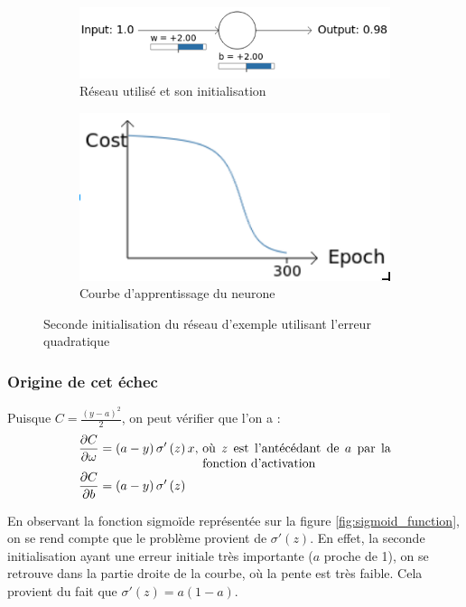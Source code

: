 \begin{figure}[h]
\centering
\begin{subfigure}{.5\textwidth}
  \centering
  \includegraphics[width=.6\linewidth]{img/entropiecroisee_reseau_utilise_init2.png}
  \caption{Réseau utilisé et son initialisation}
  \label{fig:initialisation2-entropiecroisee-schema}
\end{subfigure}%
\begin{subfigure}{.4\textwidth}
  \centering
  \includegraphics[width=.4\linewidth]{img/entropiecroisee_apprentissage2.png}
  \caption{Courbe d'apprentissage du neurone}
  \label{fig:initialisation2-entropiecroisee-courbe}
\end{subfigure}
\caption{Seconde initialisation du réseau d'exemple utilisant l'erreur quadratique}
\label{fig:initialisation2-entropiecroisee}
\end{figure}

\subsubsection{Origine de cet échec}

Puisque $C = \frac{(y-a)^2}{2}$, on peut vérifier que l'on a :
\begin{align}
 \frac{\partial C}{\partial \omega} &= \left(a-y\right)\sigma'\left(z\right)x \text{, \parbox[t]{15em}{où $z$ est l'antécédant de $a$ par la fonction d'activation}}\\
 \frac{\partial C}{\partial b} &= \left(a-y\right)\sigma'\left(z\right) 
\end{align}

En observant la fonction sigmoïde représentée sur la figure \ref{fig:sigmoid_function}, on se rend compte que le problème provient de $\sigma'\left(z\right)$.
En effet, la seconde initialisation ayant une erreur initiale très importante ($a$ proche de 1), on se retrouve dans la 
partie droite de la courbe, où la pente est très faible. Cela provient du fait que $\sigma'\left(z\right) = a\left(1-a\right)$.

